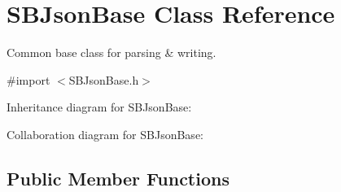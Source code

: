 \hypertarget{interface_s_b_json_base}{
\section{\-S\-B\-Json\-Base \-Class \-Reference}
\label{interface_s_b_json_base}
}


\-Common base class for parsing \& writing.  




{\ttfamily \#import $<$\-S\-B\-Json\-Base.\-h$>$}



\-Inheritance diagram for \-S\-B\-Json\-Base\-:


\-Collaboration diagram for \-S\-B\-Json\-Base\-:
\subsection*{\-Public \-Member \-Functions}
